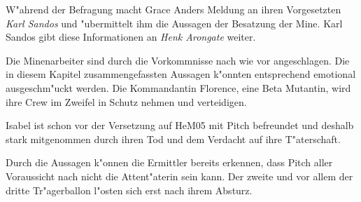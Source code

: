 W"ahrend der Befragung macht Grace Anders Meldung an ihren Vorgesetzten \emph{Karl Sandos} und "ubermittelt ihm die Aussagen der Besatzung der Mine. Karl Sandos gibt diese Informationen an \emph{Henk Arongate} weiter.

\begin{remarks}
	Die Minenarbeiter sind durch die Vorkommnisse nach wie vor angeschlagen. Die in diesem Kapitel zusammengefassten Aussagen k"onnten entsprechend emotional ausgeschm"uckt werden. Die Kommandantin Florence, eine Beta Mutantin, wird ihre Crew im Zweifel in Schutz nehmen und verteidigen.

	Isabel ist schon vor der Versetzung auf HeM05 mit Pitch befreundet und deshalb stark mitgenommen durch ihren Tod und dem Verdacht auf ihre T"aterschaft.

	Durch die Aussagen k"onnen die Ermittler bereits erkennen, dass Pitch aller Voraussicht nach nicht die Attent"aterin sein kann. Der zweite und vor allem der dritte Tr"agerballon l"osten sich erst nach ihrem Absturz.		
\end{remarks}
